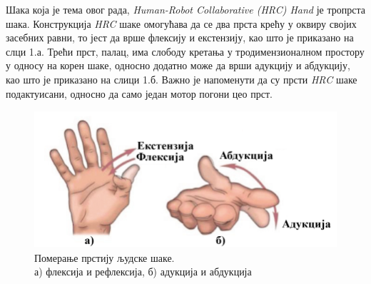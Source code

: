 \documentclass{article}
\begin{document}
\indent Шака која је тема овог рада, \textit{Human-Robot Collaborative
(HRC) Hand} је тропрста шака. Конструкција \textit{HRC} шаке омогућава да се два прста крећу у оквиру 
својих засебних равни, то јест да врше флексију и екстензију, као што је приказано на слци 1.а. Трећи прст, палац, има слободу кретања у 
тродимензионалном простору у односу на корен шаке, односно додатно може да врши адукцију и абдукцију, као што је 
приказано на слици 1.б. Важно је напоменути да су 
прсти \textit{HRC} шаке подактуисани, односно да само један мотор погони цео прст.
\begin{figure}[H]
\centering
\includegraphics[height=2in]{Images/Slika1.png}
\caption{Померање прстију људске шаке. \\ а) флексија и рефлексија, б) адукција и абдукција \cite{abduction}}
\label{fig:figure1}
\end{figure}
\end{document}
